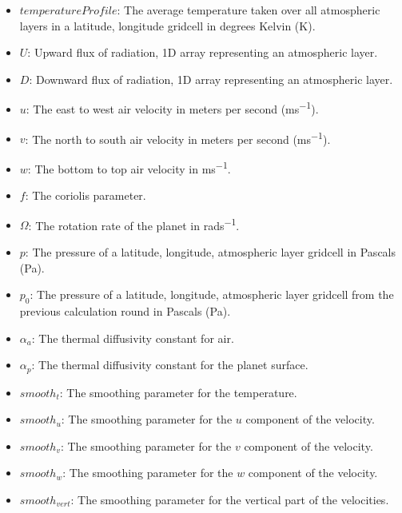 \begin{itemize}
    \item $temperatureProfile$: The average temperature taken over all atmospheric layers in a latitude, longitude gridcell in degrees Kelvin (\si{K}).
    \item $U$: Upward flux of radiation, 1D array representing an atmospheric layer.
    \item $D$: Downward flux of radiation, 1D array representing an atmospheric layer.
    \item $u$: The east to west air velocity in meters per second (\si{ms^{-1}}).
    \item $v$: The north to south air velocity in meters per second (\si{ms^{-1}}).
    \item $w$: The bottom to top air velocity in \si{ms^{-1}}.
    \item $f$: The coriolis parameter.
    \item $\Omega$: The rotation rate of the planet in \si{rads^{-1}}.
    \item $p$: The pressure of a latitude, longitude, atmospheric layer gridcell in Pascals (\si{Pa}).
    \item $p_0$: The pressure of a latitude, longitude, atmospheric layer gridcell from the previous calculation round in Pascals (\si{Pa}).
    \item $\alpha_a$: The thermal diffusivity constant for air.
    \item $\alpha_p$: The thermal diffusivity constant for the planet surface.
    \item $smooth_t$: The smoothing parameter for the temperature.
    \item $smooth_u$: The smoothing parameter for the $u$ component of the velocity.
    \item $smooth_v$: The smoothing parameter for the $v$ component of the velocity.
    \item $smooth_w$: The smoothing parameter for the $w$ component of the velocity.
    \item $smooth_{vert}$: The smoothing parameter for the vertical part of the velocities.
\end{itemize}